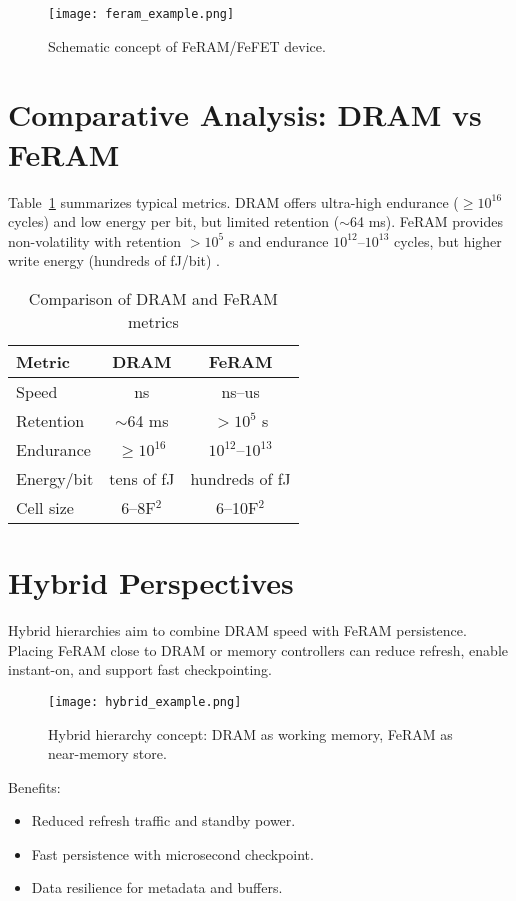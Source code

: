 \documentclass[journal]{IEEEtran}
\begin{document}
\begin{figure}[!t]
\centering
\texttt{[image: feram\_example.png]}
\caption{Schematic concept of FeRAM/FeFET device.}
\label{fig:feram}
\end{figure}

\section{Comparative Analysis: DRAM vs FeRAM}
Table~\ref{tab:comparison} summarizes typical metrics. DRAM offers ultra-high 
endurance ($\geq 10^{16}$ cycles) and low energy per bit, but limited 
retention ($\sim$64 ms). FeRAM provides non-volatility with retention 
$>10^{5}$ s and endurance $10^{12}$--$10^{13}$ cycles, but higher write 
energy (hundreds of fJ/bit) \cite{noheda2023,martin2020}.

\begin{table}[!t]
\centering
\caption{Comparison of DRAM and FeRAM metrics}
\label{tab:comparison}
\begin{tabular}{lcc}
\toprule
Metric & DRAM & FeRAM \\
\midrule
Speed & ns & ns--us \\
Retention & $\sim$64 ms & $>10^{5}$ s \\
Endurance & $\geq 10^{16}$ & $10^{12}$--$10^{13}$ \\
Energy/bit & tens of fJ & hundreds of fJ \\
Cell size & 6--8F$^{2}$ & 6--10F$^{2}$ \\
\bottomrule
\end{tabular}
\end{table}

\section{Hybrid Perspectives}
Hybrid hierarchies aim to combine DRAM speed with FeRAM persistence. 
Placing FeRAM close to DRAM or memory controllers can reduce refresh, 
enable instant-on, and support fast checkpointing.

\begin{figure}[!t]
\centering
\texttt{[image: hybrid\_example.png]}
\caption{Hybrid hierarchy concept: DRAM as working memory, FeRAM as 
near-memory store.}
\label{fig:hybrid}
\end{figure}

Benefits:
\begin{itemize}
\item Reduced refresh traffic and standby power.
\item Fast persistence with microsecond checkpoint.
\item Data resilience for metadata and buffers.
\end{itemize}
\end{document}
